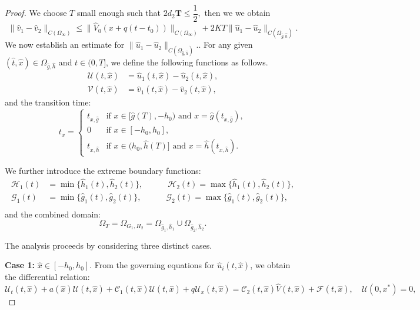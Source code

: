 \documentclass[a4paper,11pt]{amsart}
\theoremstyle{definition}
\numberwithin{equation}{section}
\theoremstyle{definition}
\begin{document}
\begin{proof}
We choose $T$ small enough such that $2d_2 \mathbf{T} \leq \dfrac{1}{2},$ then we we obtain
\begin{equation}\label{Eq_Finale222}
\|\hat{v}_1 - \hat{v}_2\|_{C(\Omega_\infty)}  \leq \| \hat{V}_0(x+q(t-t_0))\|_{C(\Omega_\infty)} + 2 K T\|\hat{u}_1 - \hat{u}_2\|_{C(\Omega_{\hat{g},\hat{h}})} .
\end{equation}
We now establish an estimate for $\|\hat{u}_1 - \hat{u}_2\|_{C(\Omega_{\hat{g},\hat{h}})}.$. For any given $(\hat{t},\hat{x})\in \Omega_{\hat{g},\hat{h}}$ and $t\in(0,T]$, we define the following functions as follows.
\begin{align*}
\mathcal{U}(t, \hat{x}) &= \hat{u}_1(t,\hat{x}) - \hat{u}_2(t, \hat{x}), \\
\mathcal{V}(t, \hat{x}) &= \hat{v}_1(t, \hat{x}) - \hat{v}_2(t, \hat{x}),
\end{align*}
and the transition time:
\begin{equation}\label{eq:transition_time}
t_x =
\begin{cases}
t_{x,\hat{g}} & \text{if } x\in[\hat{g}(T),-h_0) \text{ and } x = \hat{g}(t_{x,\hat{g}}), \\
0 & \text{if } x\in[-h_0,h_0], \\
t_{x,\hat{h}} & \text{if } x\in(h_0,\hat{h}(T)] \text{ and } x = \hat{h}(t_{x,\hat{h}}).
\end{cases}
\end{equation}

We further introduce the extreme boundary functions:
\begin{align*}
\mathcal{H}_1(t) &= \min\{\hat{h}_1(t), \hat{h}_2(t)\}, \quad\quad\quad \mathcal{H}_2(t) = \max\{\hat{h}_1(t), \hat{h}_2(t)\},\\
\mathcal{G}_1(t) &= \min\{\hat{g}_1(t), \hat{g}_2(t)\}, \quad\quad\quad \mathcal{G}_2(t) = \max\{\hat{g}_1(t), \hat{g}_2(t)\},\\
\end{align*}
and the combined domain:
\[
\Omega_T = \Omega_{G_1,H_2} = \Omega_{\hat{g}_1, \hat{h}_1} \cup \Omega_{\hat{g}_2,\hat{h}_2}.
\]

The analysis proceeds by considering three distinct cases.

\textbf{Case 1:} $\hat{x} \in[-h_0,h_0]$. From the governing equations for $\hat{u}_i(t, \hat{x})$, we obtain the differential relation:
\begin{equation}\label{eq:u_difference}
\mathcal{U}_t(t, \hat{x}) + a(\hat{x}) \mathcal{U}(t, \hat{x})+ \mathcal{C}_1(t,\hat{x})\mathcal{U}(t, \hat{x}) + q \mathcal{U}_x(t, \hat{x})  = \mathcal{C}_2(t, \hat{x})\hat{V}(t,\hat{x}) + \mathcal{F}(t,\hat{x}), \quad \mathcal{U}(0,x^*) = 0,
\end{equation}


\end{proof}
\end{document}
